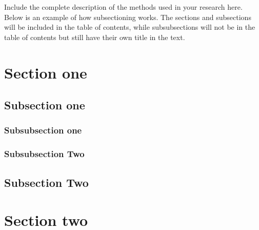 
Include the complete description of the methods used in your research here. \\

\noindent Below is an example of how subsectioning works. The sections and subsections will be included in the table of contents, while subsubsections will not be in the table of contents but still have their own title in the text.

\section{Section one}

\subsection{Subsection one}

\subsubsection{Subsubsection one}

\subsubsection{Subsubsection Two}

\subsection{Subsection Two}

\section{Section two}

